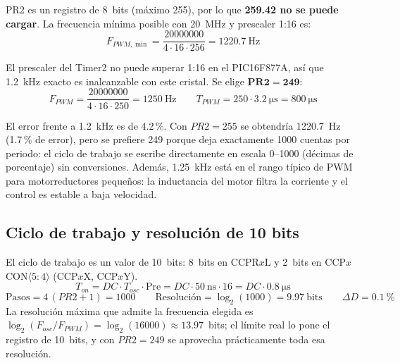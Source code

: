 PR2 es un registro de 8~bits (máximo 255), por lo que \textbf{259.42 no se
puede cargar}. La frecuencia mínima posible con \SI{20}{\mega\hertz} y
prescaler 1:16 es:
\begin{equation}
  F_{PWM,\min} = \frac{\num{20000000}}{4\cdot 16\cdot 256} = \SI{1220.7}{\hertz}
\end{equation}

El prescaler del Timer2 no puede superar 1:16 en el PIC16F877A, así que
\SI{1.2}{\kilo\hertz} exacto es inalcanzable con este cristal. Se elige
$\mathbf{PR2 = 249}$:
\begin{equation}
  F_{PWM} = \frac{\num{20000000}}{4\cdot 16\cdot 250} = \SI{1250}{\hertz}
  \qquad
  T_{PWM} = 250 \cdot \SI{3.2}{\micro\second} = \SI{800}{\micro\second}
\end{equation}

El error frente a \SI{1.2}{\kilo\hertz} es de 4.2\,\%. Con $PR2 = 255$ se
obtendría \SI{1220.7}{\hertz} (1.7\,\% de error), pero se prefiere 249 porque
deja exactamente 1000 cuentas por periodo: el ciclo de trabajo se escribe
directamente en escala 0--1000 (décimas de porcentaje) sin conversiones.
Además, \SI{1.25}{\kilo\hertz} está en el rango típico de PWM para
motorreductores pequeños: la inductancia del motor filtra la corriente y el
control es estable a baja velocidad.

\subsection{Ciclo de trabajo y resolución de 10 bits}

El ciclo de trabajo es un valor de 10~bits: 8~bits en CCPR$x$L y 2~bits en
CCP$x$CON$\langle5{:}4\rangle$ (CCP$x$X, CCP$x$Y).
\begin{equation}
  T_{on} = DC\cdot T_{osc}\cdot \text{Pre} = DC\cdot \SI{50}{\nano\second}\cdot 16
         = DC\cdot \SI{0.8}{\micro\second}
\end{equation}
\begin{equation}
  \text{Pasos} = 4\,(PR2+1) = 1000
  \qquad
  \text{Resolución} = \log_2(1000) = \num{9.97}~\text{bits}
  \qquad
  \Delta D = \SI{0.1}{\percent}
\end{equation}
La resolución máxima que admite la frecuencia elegida es
$\log_2(F_{osc}/F_{PWM}) = \log_2(16000) \approx 13.97$~bits; el límite real lo
pone el registro de 10~bits, y con $PR2 = 249$ se aprovecha prácticamente toda
esa resolución.

